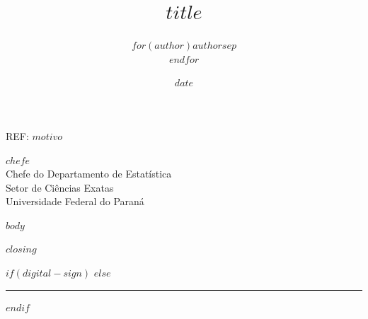 \documentclass[a4paper, 11pt]{letter}
\title{$title$}
\title{}
\author{$for(author)$$author$$sep$ \\ $endfor$}
\author{}
\date{$date$}
\date{}
\begin{document}
\begin{letter} {REF: $motivo$}

  \opening{
    \noindent $chefe$ \\
    Chefe do Departamento de Estatística \\
    Setor de Ciências Exatas \\
    Universidade Federal do Paraná }

  \pagestyle{fancy}
  \thispagestyle{fancy}

  \hspace{3cm}

  $body$

  \vspace{0.3cm}
  $closing$
  \vspace{0.3cm}

  \hfill\begin{minipage}{0.5\linewidth}
    $if(digital-sign)$
    $else$
    \vspace{2cm}
    \rule{\textwidth}{0.5pt}
    $endif$
  \end{minipage}
  \vfill
  \vspace{-1.5cm}

\end{letter}
\end{document}
